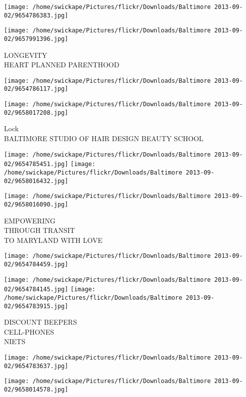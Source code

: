 \documentclass[10pt,letterpaper]{article}
\begin{document}
\texttt{[image: /home/swickape/Pictures/flickr/Downloads/Baltimore 2013-09-02/9654786383.jpg]}

\vspace{0.25in}
\texttt{[image: /home/swickape/Pictures/flickr/Downloads/Baltimore 2013-09-02/9657991396.jpg]}

LONGEVITY\\
HEART PLANNED PARENTHOOD
\pagebreak

\texttt{[image: /home/swickape/Pictures/flickr/Downloads/Baltimore 2013-09-02/9654786117.jpg]}

\vspace{0.25in}
\texttt{[image: /home/swickape/Pictures/flickr/Downloads/Baltimore 2013-09-02/9658017208.jpg]}

Lock\\
BALTIMORE STUDIO OF HAIR DESIGN BEAUTY SCHOOL
\pagebreak

\texttt{[image: /home/swickape/Pictures/flickr/Downloads/Baltimore 2013-09-02/9654785451.jpg]}
\texttt{[image: /home/swickape/Pictures/flickr/Downloads/Baltimore 2013-09-02/9658016432.jpg]}

\texttt{[image: /home/swickape/Pictures/flickr/Downloads/Baltimore 2013-09-02/9658016090.jpg]}

EMPOWERING\\
THROUGH TRANSIT\\
TO MARYLAND WITH LOVE
\pagebreak

\texttt{[image: /home/swickape/Pictures/flickr/Downloads/Baltimore 2013-09-02/9654784459.jpg]}

\vspace{0.25in}
\texttt{[image: /home/swickape/Pictures/flickr/Downloads/Baltimore 2013-09-02/9654784145.jpg]}
\texttt{[image: /home/swickape/Pictures/flickr/Downloads/Baltimore 2013-09-02/9654783915.jpg]}

DISCOUNT BEEPERS\\
CELL{-}PHONES\\
NIETS
\pagebreak

\texttt{[image: /home/swickape/Pictures/flickr/Downloads/Baltimore 2013-09-02/9654783637.jpg]}

\vspace{0.25in}
\texttt{[image: /home/swickape/Pictures/flickr/Downloads/Baltimore 2013-09-02/9658014578.jpg]}
\end{document}
